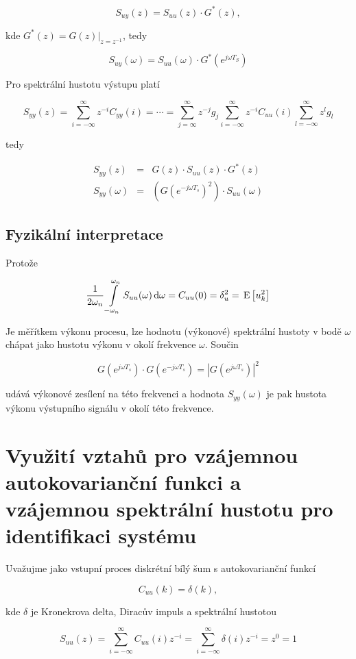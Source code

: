 \[ S_{uy}(z) = S_{uu}(z)\cdot G^*(z), \]

kde $G^*(z)=G(z)|_{z=z^{-1}}$, tedy

\[ S_{uy}(\omega) = S_{uu}(\omega)\cdot G^*\left(e^{j\omega T_S}\right)  \]

Pro spektrální hustotu výstupu platí

\[ S_{yy}(z) = \sum_{i=-\infty}^\infty z^{-i}C_{yy}(i) = \cdots = \sum_{j=\infty}^\infty z^{-j}g_j \sum_{i=-\infty}^\infty z^{-i} C_{uu}(i)\sum_{l=-\infty}^\infty z^{l}g_l \]

tedy

\begin{eqnarray*}
S_{yy}(z) & = & G(z)\cdot S_{uu}(z)\cdot G^*(z)\\
S_{yy}(\omega) & = & \left(G\left(e^{-j\omega T_s}\right)^2\right)\cdot S_{uu}(\omega)
\end{eqnarray*}

\subsection{Fyzikální interpretace}
Protože

\[ \frac{1}{2\omega_n}\int\limits_{-\omega_n}^{\omega_n}S_{uu}(\omega)\,\mathrm{d}\omega = C_{uu}(0)=\delta_u^2=\,\mathrm{E}\left[u_k^2\right] \]

Je měřítkem výkonu procesu, lze hodnotu (výkonové) spektrální hustoty v bodě $\omega$ chápat jako hustotu výkonu v okolí frekvence $\omega$. Součin

\[ G\left(e^{j\omega T_s}\right)\cdot G\left(e^{-j\omega T_s}\right) = \left|G\left(e^{j\omega T_s}\right)\right|^2 \]

udává výkonové zesílení na této frekvenci a hodnota $S_{yy}(\omega)$ je pak hustota výkonu výstupního signálu v okolí této frekvence.

\section{Využití vztahů pro vzájemnou autokovarianční funkci a vzájemnou spektrální hustotu pro identifikaci systému}

Uvažujme jako vstupní proces diskrétní bílý šum s autokovarianční funkcí

\[ C_{uu}(k) = \delta(k), \]

kde $\delta$ je Kronekrova delta, Diracův impuls a spektrální hustotou

\[ S_{uu}(z) = \sum_{i=-\infty}^\infty C_{uu}(i)z^{-i} = \sum_{i=-\infty}^\infty \delta(i)z^{-i}=z^0=1 \]

